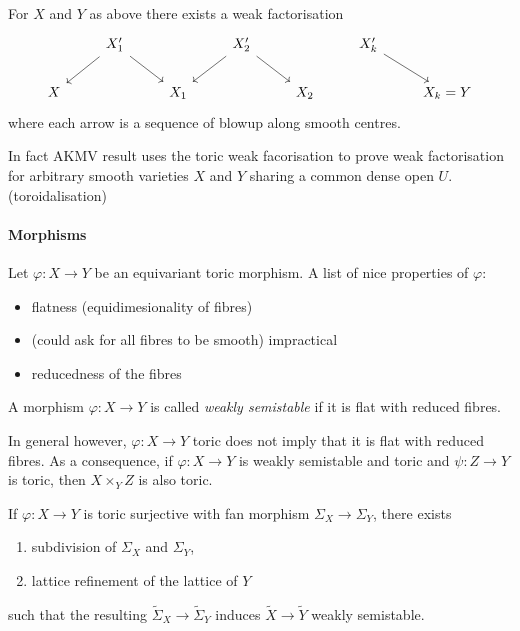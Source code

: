 \documentclass[a4paper]{article}
\begin{document}
\begin{theorem}
  For \(X\) and \(Y\) as above there exists a weak factorisation
  \[
    \begin{tikzcd}
      & X_1' \ar[dl] \ar[dr] & & X_2' \ar[dl] \ar[dr] & & X_k' \ar[dr]\\
      X & & X_1 & & X_2 & & X_k = Y
    \end{tikzcd}
  \]
  where each arrow is a sequence of blowup along smooth centres.
\end{theorem}

In fact AKMV result uses the toric weak facorisation to prove weak factorisation for arbitrary smooth varieties \(X\) and \(Y\) sharing a common dense open \(U\). (toroidalisation)

\paragraph{Morphisms}

Let \(\varphi: X \to Y\) be an equivariant toric morphism. A list of nice properties of \(\varphi\):
\begin{itemize}
\item flatness (equidimesionality of fibres)
\item (could ask for all fibres to be smooth) impractical
\item reducedness of the fibres
\end{itemize}

\begin{definition}
  A morphism \(\varphi: X \to Y\) is called \emph{weakly semistable} if it is flat with reduced fibres.
\end{definition}

In general however, \(\varphi: X \to Y\) toric does not imply that it is flat with reduced fibres. As a consequence, if \(\varphi: X \to Y\) is weakly semistable and toric and \(\psi: Z \to Y\) is toric, then \(X \times_Y Z\) is also toric.

\begin{theorem}
  If \(\varphi: X \to Y\) is toric surjective with fan morphism \(\Sigma_X \to \Sigma_Y\), there exists
  \begin{enumerate}
  \item subdivision of \(\Sigma_X\) and \(\Sigma_Y\),
  \item lattice refinement of the lattice of \(Y\)
  \end{enumerate}
  such that the resulting \(\tilde \Sigma_X \to \tilde \Sigma_Y\) induces \(\tilde X \to \tilde Y\) weakly semistable.
\end{theorem}
\end{document}
